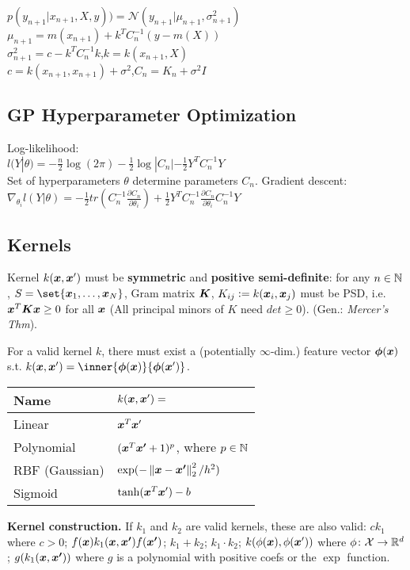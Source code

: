 $p(y_{n+1}|x_{n+1}, X, y)) = \mathcal{N}(y_{n+1} | \mu_{n+1}, \sigma^2_{n+1})$	\\
$\mu_{n+1} = m(x_{n+1})+k^T C^{-1}_n (y\!-\!m(X))$ \\
$\sigma^2_{n+1} = c - k^T C^{-1}_n k$,$k = k(x_{n+1}, X)$ \\
$c = k(x_{n+1},x_{n+1})\!+\!\sigma^2$,$C_n = K_n + \sigma^2 I$

\subsection*{GP Hyperparameter Optimization}
Log-likelihood:\\
$l(Y|\theta) = -\frac{n}{2} \log(2\pi) - \frac{1}{2} \log |C_n| - \frac{1}{2} Y^T C_n^{-1}Y$\\
Set of hyperparameters $\theta$ determine parameters $C_n$. Gradient descent: $\nabla_{\theta_i}l(Y|\theta) = -\frac{1}{2}tr(C_n^{-1} \frac{\partial C_n}{\partial \theta_i}) + \frac{1}{2} Y^T C_n^{-1} \frac{\partial C_n}{\partial \theta_i} C_n^{-1} Y$

\subsection*{Kernels}

    Kernel $k(\boldsymbol{x}, \boldsymbol{x}')$ must be \textbf{symmetric} and \textbf{positive semi-definite}: for any $n \in \mathbb{N}$, $S = \set{\b{x}_1, \ldots, \b{x}_N}$, Gram matrix $\boldsymbol{K}$, $K_{ij} \vcentcolon= k(\boldsymbol{x}_i, \boldsymbol{x}_j)$ must be PSD, i.e. $\boldsymbol{x}^T\boldsymbol{K}\boldsymbol{x} \geq 0$ for all $\boldsymbol{x}$ (All principal minors of $K$ need $det \geq 0$). (Gen.: \textit{Mercer's Thm}).


    For a valid kernel $k$, there must exist a (potentially $\infty$-dim.) feature vector $\boldsymbol{\phi}(\boldsymbol{x})$ s.t. $k(\b{x}, \b{x}') = \inner{\b{\phi}(\b{x})}{\b{\phi}(\b{x}')}$.
    
    \begin{tabular}{ll}
    \hline
    \textbf{Name} & $k(\boldsymbol{x}, \boldsymbol{x}') = $ \\
    \hline
    Linear & $\boldsymbol{x}^T \boldsymbol{x}'$ \\
    Polynomial & $(\boldsymbol{x}^T\boldsymbol{x'} + 1)^p$, where $p \in \mathbb{N}$ \\
    RBF (Gaussian) & $\exp(-\left\lVert\boldsymbol{x} - \boldsymbol{x'}\right\rVert_2^2 / h^2)$ \\
    Sigmoid & $\tanh(\boldsymbol{x}^T \boldsymbol{x}') - b$ 
    \\
    \hline
    \end{tabular}

    \textbf{Kernel construction.} If $k_1$ and $k_2$ are valid kernels, these are also valid:
    $ck_1$ where $c > 0$;
    $f(\boldsymbol{x}) k_1(\boldsymbol{x}, \boldsymbol{x'}) f(\boldsymbol{x'})$;
    $k_1 + k_2$; $k_1 \cdot k_2$;
    $k(\phi(\boldsymbol{x}), \phi(\boldsymbol{x}'))$ where $\phi \colon \mathcal{X} \rightarrow \mathbb R^d$;
    $g(k_1(\boldsymbol{x}, \boldsymbol{x'}))$ where $g$ is a polynomial with positive coefs or the $\exp$ function.

	

